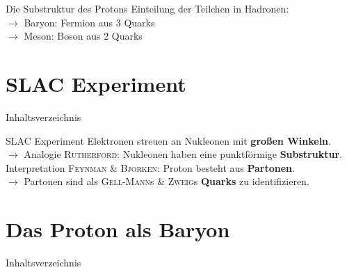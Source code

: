 \documentclass[t,9pt]{beamer}
\begin{document}
        \begin{frame}{Die Substruktur des Protons}
                Einteilung der Teilchen in Hadronen: %
                \\\vspace{.1cm} $\rightarrow $ Baryon: Fermion aus 3 Quarks
                \\ $\rightarrow $ Meson: Boson aus 2 Quarks
        \end{frame}

        \section{SLAC Experiment}

        \begin{frame}{Inhaltsverzeichnis}
                \tableofcontents[currentsection]
        \end{frame}

        \begin{frame}{SLAC Experiment}
                \pause
                Elektronen streuen an Nukleonen mit \textbf{großen Winkeln}. %
                \\\vspace{.1cm} $\rightarrow $ Analogie \textsc{Rutherford}: Nukleonen haben eine punktförmige \textbf{Substruktur}.
                \pause
                \\\vspace{.5cm} Interpretation \textsc{Feynman} \& \textsc{Bjorken}: Proton besteht aus \textbf{Partonen}.
                \\\vspace{.1cm} $\rightarrow $ Partonen sind als \textsc{Gell-Mann}s \& \textsc{Zweig}s \textbf{Quarks} zu identifizieren. %
        \end{frame} 

        \section{Das Proton als Baryon}

        \begin{frame}{Inhaltsverzeichnis}
                \tableofcontents[currentsection]
        \end{frame}
\end{document}
